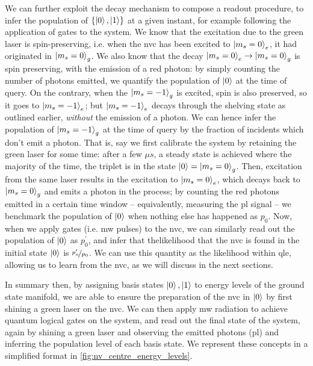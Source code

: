 We can further exploit the decay mechanism to compose a readout procedure, 
    to infer the population of $\{\ket{0}, \ket{1}\}$ at a given instant, 
    for example following the application of gates to the system. 
We know that the excitation due to the green laser is spin-preserving, 
    i.e. when the \gls{nvc} has been excited to $\ket{m_s=0}_e$, 
    it had originated in $\ket{m_s=0}_g$.
We also know that the decay $\ket{m_s=0}_e \rightarrow \ket{m_s=0}_g$ is spin preserving, with the emission of 
    a red photon: by simply counting the number of photons emitted, we quantify the population of $\ket{0}$
    at the time of query. 
On the contrary, when the $\ket{m_s=-1}_g$ is excited, spin is also preserved, 
    so it goes to $\ket{m_s=-1}_e$;
    but $\ket{m_s=-1}_e$ decays 
    through the shelving state as outlined earlier, 
    \emph{without} the emission of a photon. 
We can hence infer the population of $\ket{m_s=-1}_g$ at the time of query by the fraction of incidents which don't emit a photon.
That is, say we first calibrate the system by retaining the green laser for some time: 
    after a few $\mu s$, a steady state is achieved where the majority of the time, the triplet is in the state $\ket{0} = \ket{m_s=0}_g$. 
Then, excitation from the same laser results in the excitation to $\ket{m_s=0}_e$, 
    which decays back to $\ket{m_s=0}_g$ and emits a photon in the process; 
    by counting the red photons emitted in a certain time window -- equivalently, measuring the \gls{pl} signal -- 
    we benchmark the population of $\ket{0}$ when nothing else has happened as $p_0$. 
Now, when we apply gates (i.e. \gls{mw} pulses) to the \gls{nvc}, 
    we can similarly read out the population of $\ket{0}$ as $p_0^{\prime}$,
    and infer that the\gls{likelihood} that the \gls{nvc} is found in the initial state $\ket{0}$ is $\nicefrac{p_o^{\prime}}{p_0}$. 
We can use this quantity as the \gls{likelihood} within \gls{qle}, allowing us to learn from the \gls{nvc},
    as we will discuss in the next sections. 
\par 

In summary then, by assigning basis states $\ket{0}, \ket{1}$ to energy levels of the ground state manifold, 
    we are able to ensure the preparation of the \gls{nvc} in $\ket{0}$ by first shining a green laser on the \gls{nvc}. 
We can then apply \gls{mw} radiation to achieve quantum logical gates on the system, 
    and read out the final state of the system, again by shining a green laser
    and observing the emitted photons (\gls{pl}) and inferring the population level of each basis state. 
We represent these concepts in a simplified format in \cref{fig:nv_centre_energy_levels}. 



